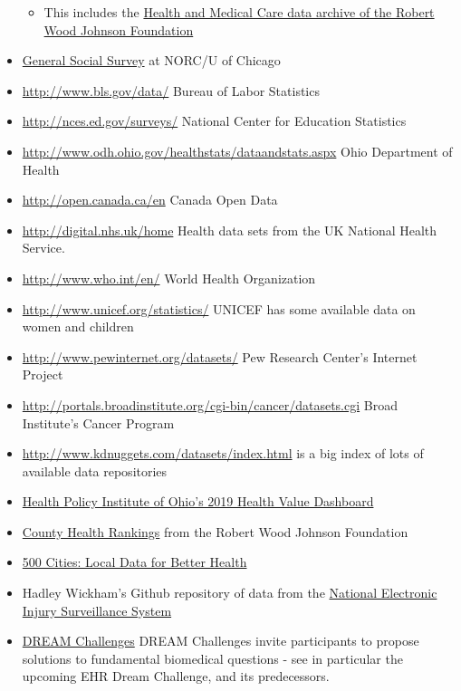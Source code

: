 \documentclass[]{book}
\providecommand{\tightlist}{%
  \setlength{\itemsep}{0pt}\setlength{\parskip}{0pt}}
\begin{document}
\begin{itemize}
  \begin{itemize}
  \tightlist
  \item
    This includes the \href{http://www.icpsr.umich.edu/icpsrweb/HMCA/}{Health and Medical Care data archive of the Robert Wood Johnson Foundation}
  \end{itemize}
\item
  \href{http://gss.norc.org/}{General Social Survey} at NORC/U of Chicago
\item
  \url{http://www.bls.gov/data/} Bureau of Labor Statistics
\item
  \url{http://nces.ed.gov/surveys/} National Center for Education Statistics
\item
  \url{http://www.odh.ohio.gov/healthstats/dataandstats.aspx} Ohio Department of Health
\item
  \url{http://open.canada.ca/en} Canada Open Data
\item
  \url{http://digital.nhs.uk/home} Health data sets from the UK National Health Service.
\item
  \url{http://www.who.int/en/} World Health Organization
\item
  \url{http://www.unicef.org/statistics/} UNICEF has some available data on women and children
\item
  \url{http://www.pewinternet.org/datasets/} Pew Research Center's Internet Project
\item
  \url{http://portals.broadinstitute.org/cgi-bin/cancer/datasets.cgi} Broad Institute's Cancer Program
\item
  \url{http://www.kdnuggets.com/datasets/index.html} is a big index of lots of available data repositories
\item
  \href{https://www.healthpolicyohio.org/2019-health-value-dashboard/}{Health Policy Institute of Ohio's 2019 Health Value Dashboard}
\item
  \href{https://www.countyhealthrankings.org/}{County Health Rankings} from the Robert Wood Johnson Foundation
\item
  \href{https://www.cdc.gov/500cities/}{500 Cities: Local Data for Better Health}
\item
  Hadley Wickham's Github repository of data from the \href{https://github.com/hadley/neiss}{National Electronic Injury Surveillance System}
\item
  \href{http://dreamchallenges.org/}{DREAM Challenges} DREAM Challenges invite participants to propose solutions to fundamental biomedical questions - see in particular the upcoming EHR Dream Challenge, and its predecessors.


\end{itemize}
\end{document}
